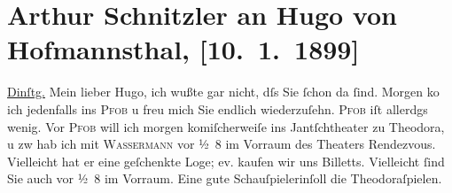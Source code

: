

         
         \renewcommand{\erwaehntePersonen}{Personen: Elisabeth Anders, Hugo von Hofmannsthal, Jakob Wassermann}
         \renewcommand{\erwaehnteInstitutionen}{Institutionen: Burgtheater}
         \renewcommand{\erwaehnteOrte}{Orte: Café Pfob, Jantsch-Theater, Wien}
         \renewcommand{\erwaehnteWerke}{Werke: Der grüne Kakadu. Groteske in einem Akt, Theodora}
               \section[Arthur Schnitzler an Hugo von Hofmannsthal, {[}10. 1. 1899{]}]{ Arthur Schnitzler an Hugo von Hofmannsthal, {[}10. 1. 1899{]}}\nopagebreak{}\rehead{ }\begin{ledgroupsized}[t]{13cm}\normalsize\beginnumbering \toendnotes[C]{\smallbreak\pagebreak[2]} 
\toendnotes[C]{\smallbreak}\pstart
           \raggedleft{}{\pb}\uline{Dinſtg.}\pend
           \pstart
           Mein lieber Hugo, ich wußte gar nicht, dſs Sie ſchon da ſind. Morgen
                  ko{\geminationm} ich jedenfalls ins \textsc{Pfob} u freu mich Sie endlich wiederzuſehn. \textsc{Pfob} iſt allerdgs wenig. Vor \textsc{Pfob} will ich morgen komiſcherweiſe ins Jantſchtheater zu Theodora, u zw hab
               ich mit \textsc{Wassermann} vor ½ 8 im Vorraum des Theaters Rendezvous. Vielleicht hat er eine
                  {\pb}geſchenkte Loge; ev. kaufen wir uns Billetts.
               Vielleicht ſind Sie auch vor ½ 8 im Vorraum. Eine gute Schauſpielerinſoll die Theodoraſpielen.\pend

\end{ledgroupsized}
